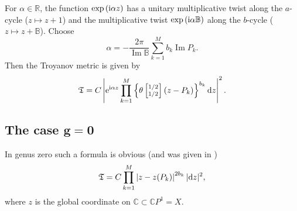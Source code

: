 \documentclass[pdftex]{sigma}
\numberwithin{equation}{section}
\theoremstyle{definition}
\begin{document}
For $\alpha\in {\mathbb R}$, the function $\exp{({\rm i}\alpha z)}$ has a unitary multiplicative twist along the $a$-cycle ($z\mapsto z+1$) and the multiplicative twist $\exp{({\rm i}\alpha {\mathbb B})}$ along the $b$-cycle
($z\mapsto z+{\mathbb B}$). Choose
\[\alpha=-\frac{2\pi}{\operatorname{Im}{\mathbb B}}\sum_{k=1}^Mb_k\operatorname{Im} P_k.\]
Then the Troyanov metric is given by
\begin{equation}
\label{Troy tori}
\mathfrak{T}=C\left|{\rm e}^{{\rm i}\alpha z} \prod_{k=1}^M \left\{ \theta\left[^{1/2}_{1/2}\right](z-P_k)\right\}^{b_k} {\rm d}z \right|^2 .
\end{equation}

\subsection*{The case $\boldsymbol{g=0}$} In genus zero such a formula is obvious (and was given in \cite{Troyanov})
\begin{equation}
\label{Troy sphere}
\mathfrak{T}=C\prod_{k=1}^M \left|z-z(P_k)\right|^{2b_k}|{\rm d}z|^2 ,
\end{equation}
where $z$ is the global coordinate on ${\mathbb C}\subset {\mathbb C}P^1=X$.
\end{document}
